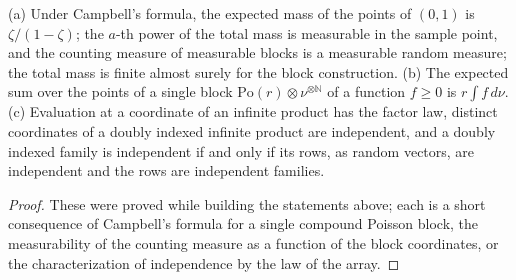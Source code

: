 \begin{lemma}\label{lem:sg:pd-block-helpers}
  \leanok
  (a) Under Campbell's formula, the expected mass of the points of $(0,1)$ is $\zeta/(1-\zeta)$; the $a$-th power of the total mass is measurable in the sample point, and the counting measure of measurable blocks is a measurable random measure; the total mass is finite almost surely for the block construction. (b) The expected sum over the points of a single block $\mathrm{Po}(r)\otimes\nu^{\otimes\mathbb N}$ of a function $f\ge0$ is $r\int f\,d\nu$. (c) Evaluation at a coordinate of an infinite product has the factor law, distinct coordinates of a doubly indexed infinite product are independent, and a doubly indexed family is independent if and only if its rows, as random vectors, are independent and the rows are independent families.
\end{lemma}

\begin{proof}
  \leanok
These were proved while building the statements above; each is a short consequence of Campbell's formula for a single compound Poisson block, the measurability of the counting measure as a function of the block coordinates, or the characterization of independence by the law of the array.
\end{proof}

